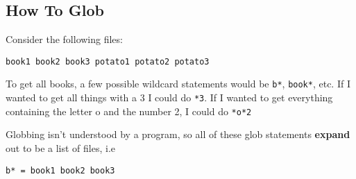 \subsection{How To Glob}

Consider the following files:

\begin{verbatim}
book1 book2 book3 potato1 potato2 potato3
\end{verbatim}

To get all books, a few possible wildcard statements would be \texttt{b*},
\texttt{book*}, etc. If I wanted to get all things with a 3 I could do
\texttt{*3}.
If I wanted to get everything containing the letter o and the number 2, I could
do \texttt{*o*2}

Globbing isn't understood by a program, so all of these glob statements
\textbf{expand} out to be a list of files, i.e
\begin{verbatim}
b* = book1 book2 book3
\end{verbatim}

